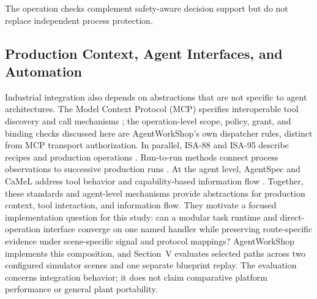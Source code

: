 The operation checks complement safety-aware decision support
\cite{jiang2026agentic} but do not replace independent process protection.

\subsection{Production Context, Agent Interfaces, and Automation}
Industrial integration also depends on abstractions that are not specific to
agent architectures. The Model Context Protocol (MCP) specifies interoperable
tool discovery and call mechanisms \cite{mcp2024}; the operation-level scope,
policy, grant, and binding checks discussed here are AgentWorkShop's own
dispatcher rules, distinct from MCP transport authorization. In parallel,
ISA-88 and ISA-95 describe recipes and production operations
\cite{isa88_2010,isa95_2025}. Run-to-run methods connect process observations
to successive production runs \cite{moyne2000r2r}. At the agent level,
AgentSpec and CaMeL address tool behavior and capability-based information
flow \cite{wang2025agentspec,debenedetti2025camel}. Together, these standards
and agent-level mechanisms provide abstractions for production context, tool
interaction, and information flow. They motivate a focused implementation
question for this study: can a modular task runtime and direct-operation
interface converge on one named handler while preserving route-specific
evidence under scene-specific signal and protocol mappings? AgentWorkShop
implements this composition, and Section~V evaluates selected paths across
two configured simulator scenes and one separate blueprint replay. The
evaluation concerns integration behavior; it does not claim comparative
platform performance or general plant portability.
